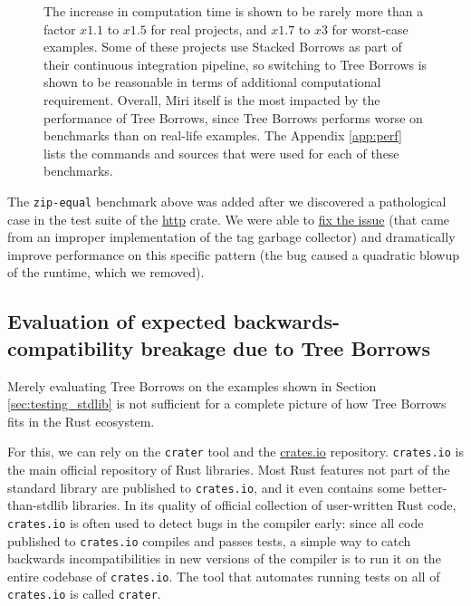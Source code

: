 \documentclass[a4paper,11pt]{article}
\theoremstyle{plain}
\theoremstyle{definition}
\theoremstyle{remark}
\begin{document}
\begin{figure}
{        The increase in computation time is shown to be rarely more than a factor
        \(x1.1\) to \(x1.5\) for real projects, and \(x1.7\) to \(x3\) for worst-case examples.
        Some of these projects use Stacked Borrows as part of their continuous integration
        pipeline, so switching to Tree Borrows is shown to be reasonable in terms of
        additional computational requirement.
        Overall, Miri itself is the most impacted by the performance of Tree Borrows,
        since Tree Borrows performs worse on benchmarks than on real-life examples.
        The Appendix \ref{app:perf} lists the commands and sources
        that were used for each of these benchmarks.
    }
    \label{fig:perf}
\end{figure}

The \texttt{zip-equal} benchmark above was added after we discovered a pathological
case in the test suite of the
\href{https://github.com/hyperium/http/blob/3a2f3e01c01e60b894d1f5b30554013d990010c6/src/header/name.rs#L1685-L1705}{http}
crate. We were able to \href{https://github.com/rust-lang/miri/pull/2865}{fix the issue}
(that came from an improper implementation of the tag garbage collector)
and dramatically improve performance on this specific pattern
(the bug caused a quadratic blowup of the runtime, which we removed).

\subsection{Evaluation of expected backwards-compatibility breakage due to Tree Borrows}

Merely evaluating Tree Borrows on the examples shown in Section \ref{sec:testing_stdlib}
is not sufficient for a complete picture of how Tree Borrows fits in the Rust
ecosystem.

For this, we can rely on the \texttt{crater} tool and the \href{https://crates.io}{crates.io} repository.
\texttt{crates.io} is the main official repository of Rust libraries. Most Rust features
not part of the standard library are published to \texttt{crates.io}, and it even contains some
better-than-stdlib libraries. In its quality of official collection of user-written Rust code,
\texttt{crates.io} is often used to detect bugs in the compiler early: since all code published
to \texttt{crates.io} compiles and passes tests, a simple way to catch backwards incompatibilities
in new versions of the compiler is to run it on the entire codebase of \texttt{crates.io}.
The tool that automates running tests on all of \texttt{crates.io} is called \texttt{crater}.
\end{document}
